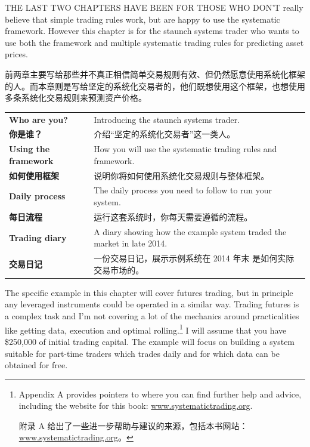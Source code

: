 
\begin{englishblock} THE LAST TWO CHAPTERS HAVE BEEN FOR THOSE WHO DON'T really believe that simple trading rules work, but are happy to use the systematic framework. However this chapter is for the staunch systems trader who wants to use both the framework and multiple systematic trading rules for predicting asset prices. \end{englishblock}

\begin{chineseblock}前两章主要写给那些并不真正相信简单交易规则有效、但仍然愿意使用系统化框架的人。而本章则是写给坚定的系统化交易者的，他们既想使用这个框架，也想使用多条系统化交易规则来预测资产价格。\end{chineseblock}


\begin{bilingualtableblock} \begin{tabularx}{\textwidth}{@{} L{0.30\textwidth} Y@{}}\textbf{Who are you?} & Introducing the staunch systems trader. \\

\textbf{你是谁？} & 介绍“坚定的系统化交易者”这一类人。 \\
\textbf{Using the framework} & How you will use the systematic trading rules and framework. \\
\textbf{如何使用框架} & 说明你将如何使用系统化交易规则与整体框架。 \\
\textbf{Daily process} & The daily process you need to follow to run your system. \\
\textbf{每日流程} & 运行这套系统时，你每天需要遵循的流程。 \\
\textbf{Trading diary} & A diary showing how the example system traded the market in late 2014. \\
\textbf{交易日记} & 一份交易日记，展示示例系统在 2014 年末 是如何实际交易市场的。 \\
\end{tabularx}
\end{bilingualtableblock}


\begin{englishblock} The specific example in this chapter will cover futures trading, but in principle any leveraged instruments could be operated in a similar way. Trading futures is a complex task and I'm not covering a lot of the mechanics around practicalities like getting data, execution and optimal rolling.\footnote{Appendix A provides pointers to where you can find further help and advice, including the website for this book: \url{www.systematictrading.org}. \par 附录 A 给出了一些进一步帮助与建议的来源，包括本书网站：\url{www.systematictrading.org}。} I will assume that you have \$250,000 of initial trading capital. The example will focus on building a system suitable for part-time traders which trades daily and for which data can be obtained for free. \end{englishblock}


